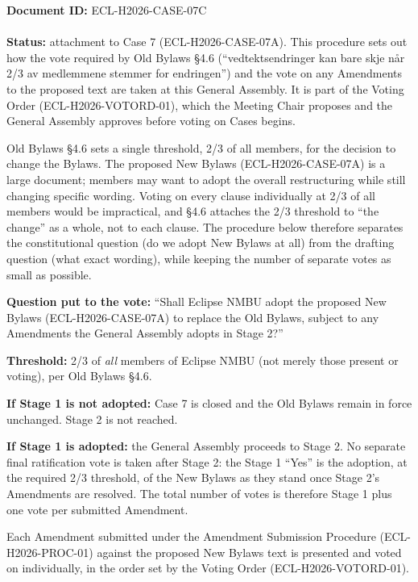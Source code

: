 \documentclass{../../../Common/Latex/Templates/rapport}
\date{\meetingdate, \meetingtime}
\begin{document}
\makecoverpage
\tableofcontents
\reportmainmatter

\noindent\textbf{Document ID:} ECL-H2026-CASE-07C\\
\meetingline\\
\textbf{Status:} attachment to Case 7 (ECL-H2026-CASE-07A). This procedure sets out how the vote required by Old Bylaws \S4.6 (``vedtektsendringer kan bare skje når 2/3 av medlemmene stemmer for endringen'') and the vote on any Amendments to the proposed text are taken at this General Assembly. It is part of the Voting Order (ECL-H2026-VOTORD-01), which the Meeting Chair proposes and the General Assembly approves before voting on Cases begins.

Old Bylaws \S4.6 sets a single threshold, 2/3 of all members, for the decision to change the Bylaws. The proposed New Bylaws (ECL-H2026-CASE-07A) is a large document; members may want to adopt the overall restructuring while still changing specific wording. Voting on every clause individually at 2/3 of all members would be impractical, and \S4.6 attaches the 2/3 threshold to ``the change'' as a whole, not to each clause. The procedure below therefore separates the constitutional question (do we adopt New Bylaws at all) from the drafting question (what exact wording), while keeping the number of separate votes as small as possible.

\textbf{Question put to the vote:} ``Shall Eclipse NMBU adopt the proposed New Bylaws (ECL-H2026-CASE-07A) to replace the Old Bylaws, subject to any Amendments the General Assembly adopts in Stage 2?''

\textbf{Threshold:} 2/3 of \emph{all} members of Eclipse NMBU (not merely those present or voting), per Old Bylaws \S4.6.

\textbf{If Stage 1 is not adopted:} Case 7 is closed and the Old Bylaws remain in force unchanged. Stage 2 is not reached.

\textbf{If Stage 1 is adopted:} the General Assembly proceeds to Stage 2. No separate final ratification vote is taken after Stage 2: the Stage 1 ``Yes'' is the adoption, at the required 2/3 threshold, of the New Bylaws as they stand once Stage 2's Amendments are resolved. The total number of votes is therefore Stage 1 plus one vote per submitted Amendment.

Each Amendment submitted under the Amendment Submission Procedure (ECL-H2026-PROC-01) against the proposed New Bylaws text is presented and voted on individually, in the order set by the Voting Order (ECL-H2026-VOTORD-01).
\end{document}
